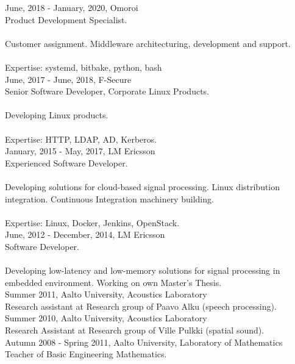 \documentclass[12pt]{article}
\begin{document}
\large{June, 2018 - January, 2020, Omoroi}\\
\normalsize{Product Development Specialist.}\\
\\
\normalsize{Customer assignment. Middleware architecturing, development and support.}\\
\\
\normalsize{Expertise: systemd, bitbake, python, bash}\\

\large{June, 2017 - June, 2018, F-Secure}\\
\normalsize{Senior Software Developer, Corporate Linux Products.}\\
\\
\normalsize{Developing Linux products.}\\
\\
\normalsize{Expertise: HTTP, LDAP, AD, Kerberos.}\\

\large{January, 2015 - May, 2017, LM Ericsson}\\
\normalsize{Experienced Software Developer.}\\
\\
\normalsize{Developing solutions for cloud-based signal processing. Linux distribution integration. Continuous Integration machinery building.}\\
\\
\normalsize{Expertise: Linux, Docker, Jenkins, OpenStack.}\\

\large{June, 2012 - December, 2014, LM Ericsson}\\
\normalsize{Software Developer.}\\
\\
\normalsize{Developing low-latency and low-memory solutions for signal processing in embedded environment. Working on own Master's Thesis.}\\

\large{Summer 2011, Aalto University, Acoustics Laboratory}\\
\normalsize{Research assistant at Research group of Paavo Alku (speech
processing).}\\

\large{Summer 2010, Aalto University, Acoustics Laboratory}\\
\normalsize{Research Assistant at Research group of Ville Pulkki (spatial
sound).}\\

\large{Autumn 2008 - Spring 2011, Aalto University, Laboratory of Mathematics}\\
\normalsize{Teacher of Basic Engineering Mathematics.}\\
\end{document}
